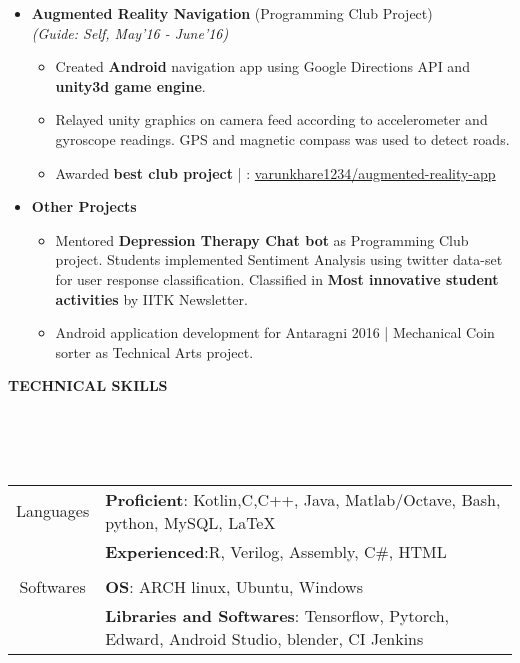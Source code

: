 \documentclass[a4paper,10pt]{article}
\newcommand{\isep}{-2 pt}
\newcommand{\lsep}{-0.5cm}
\newcommand{\resheading}[1]{{\small \colorbox{mygrey}{\begin{minipage}{0.975\textwidth}{\textbf{#1 \vphantom{p\^{E}}}}\end{minipage}}}}
\begin{document}
\begin{itemize}
\item \textbf{Augmented Reality Navigation} (Programming Club Project) \\
 \emph{(Guide: Self, May'16 - June'16)} \\[-0.6cm]
	\begin{itemize}\itemsep \isep
	\item Created \textbf{Android} navigation app using Google Directions API and \textbf{unity3d game engine}.
	\item Relayed unity graphics on camera feed according to accelerometer and gyroscope readings. GPS and magnetic compass was used to detect roads.
	\item Awarded \textbf{best club project} | \faGithub : \href{https://github.com/varunkhare1234/augmented-reality-app}{varunkhare1234/augmented-reality-app}
	\end{itemize}

\item\textbf{Other Projects}
    \begin{itemize}
    \item Mentored \textbf{Depression Therapy Chat bot} as Programming Club project. Students implemented Sentiment Analysis using twitter data-set for user response classification. Classified in \textbf{Most innovative student activities} by IITK Newsletter.
    \item Android application development for Antaragni 2016 | Mechanical Coin sorter as Technical Arts project.
    \end{itemize}
\end{itemize}	

\resheading{\textbf{TECHNICAL SKILLS} }\\[\lsep]
\\ \\
\indent \begin{tabular}{c @{\hskip 0.3in}| @{\hskip 0.1in}l}
    Languages & \textbf{Proficient}: Kotlin,C,C++, Java, Matlab/Octave, Bash, python, MySQL, \LaTeX \\
     & \textbf{Experienced}:R, Verilog, Assembly, C\#, HTML\\
     \\
     Softwares & \textbf{OS}: ARCH linux, Ubuntu, Windows\\
     & \textbf{Libraries and Softwares}: Tensorflow, Pytorch, Edward, Android Studio, blender, CI Jenkins
\end{tabular}\\ \\
\end{document}
